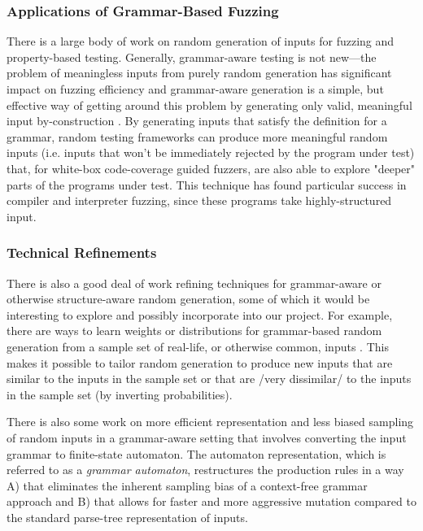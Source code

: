 \documentclass[acmsmall,nonacm,screen]{acmart}
\begin{document}
\subsubsection{Applications of Grammar-Based Fuzzing}
There is a large body of work on random generation of inputs for fuzzing and property-based testing. Generally, grammar-aware testing is not new—the problem of meaningless inputs from purely random generation has significant impact on fuzzing efficiency and grammar-aware generation is a simple, but effective way of getting around this problem by generating only valid, meaningful input by-construction \cite{yang2011finding, godefroid2008grammar, aschermann2019nautilus}. By generating inputs that satisfy the definition for a grammar, random testing frameworks can produce more meaningful random inputs (i.e. inputs that won't be immediately rejected by the program under test) that, for white-box code-coverage guided fuzzers, are also able to explore "deeper" parts of the programs under test. This technique has found particular success in compiler and interpreter fuzzing, since these programs take highly-structured input.

\subsubsection{Technical Refinements}
There is also a good deal of work refining techniques for grammar-aware or otherwise structure-aware random generation, some of which it would be interesting to explore and possibly incorporate into our project. For example, there are ways to learn weights or distributions for grammar-based random generation from a sample set of real-life, or otherwise common, inputs \cite{pavese2018inputs}. This makes it possible to tailor random generation to produce new inputs that are similar to the inputs in the sample set or that are /very dissimilar/ to the inputs in the sample set (by inverting probabilities).

There is also some work on more efficient representation and less biased sampling of random inputs in a grammar-aware setting \cite{srivastava2021gramatron} that involves converting the input grammar to finite-state automaton. The automaton representation, which is referred to as a \textit{grammar automaton}, restructures the production rules in a way A) that eliminates the inherent sampling bias of a context-free grammar approach and B) that allows for faster and more aggressive mutation compared to the standard parse-tree representation of inputs.
\end{document}
